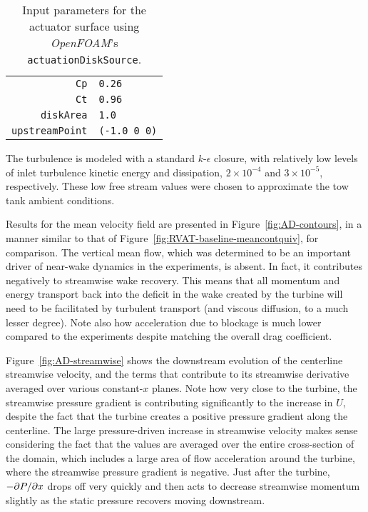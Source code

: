\begin{table}
    \begin{center}
        \begin{tabular}{r|l}
            \texttt{Cp} & \texttt{0.26} \\ 
            \texttt{Ct} & \texttt{0.96} \\ 
            \texttt{diskArea} & \texttt{1.0} \\ 
            \texttt{upstreamPoint} & \texttt{(-1.0 0 0)} \\ 
        \end{tabular} 
        \caption{Input parameters for the actuator surface using \textit{OpenFOAM}'s
            \texttt{actuationDiskSource}.}
    \label{tab:AS}
    \end{center}
\end{table}

The turbulence is modeled with a standard $k$-$\epsilon$ closure, with
relatively low levels of inlet turbulence kinetic energy and dissipation, $2
\times 10^{-4}$ and $3 \times 10^{-5}$, respectively. These low free stream
values were chosen to approximate the tow tank ambient conditions.

Results for the mean velocity field are presented in
Figure~\ref{fig:AD-contours}, in a manner similar to that of
Figure~\ref{fig:RVAT-baseline-meancontquiv}, for comparison. The vertical mean
flow, which was determined to be an important driver of near-wake dynamics in
the experiments, is absent. In fact, it contributes negatively to streamwise
wake recovery. This means that all momentum and energy transport back into the
deficit in the wake created by the turbine will need to be facilitated by
turbulent transport (and viscous diffusion, to a much lesser degree). Note also
how acceleration due to blockage is much lower compared to the experiments
despite matching the overall drag coefficient.

Figure~\ref{fig:AD-streamwise} shows the downstream evolution of the centerline
streamwise velocity, and the terms that contribute to its streamwise derivative
averaged over various constant-$x$ planes. Note how very close to the turbine,
the streamwise pressure gradient is contributing significantly to the increase
in $U$, despite the fact that the turbine creates a positive pressure gradient
along the centerline. The large pressure-driven increase in streamwise velocity
makes sense considering the fact that the values are averaged over the entire
cross-section of the domain, which includes a large area of flow acceleration
around the turbine, where the streamwise pressure gradient is negative. Just
after the turbine, $-\partial P / \partial x$ drops off very quickly and then acts to
decrease streamwise momentum slightly as the static pressure recovers moving
downstream.

